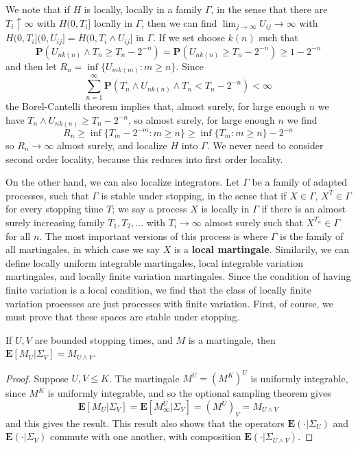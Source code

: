 We note that if $H$ is locally, locally in a family $\Gamma$, in the sense that there are $T_i \uparrow \infty$ with $H(0,T_i]$ locally in $\Gamma$, then we can find $\lim_{j \to \infty} U_{ij} \to \infty$ with $H(0,T_i](0,U_{ij}] = H(0,T_i \wedge U_{ij}]$ in $\Gamma$. If we set choose $k(n)$ such that 
%
\[ \mathbf{P}(U_{nk(n)} \wedge T_n \geq T_n - 2^{-n}) = \mathbf{P}(U_{nk(n)} \geq T_n - 2^{-n}) \geq 1 - 2^{-n} \]
%
and then let $R_n = \inf \{ U_{mk(m)}: m \geq n \}$. Since
%
\[ \sum_{n = 1}^\infty \mathbf{P}(T_n \wedge U_{nk(n)} \wedge T_n < T_n - 2^{-n}) < \infty \]
%
the Borel-Cantelli theorem implies that, almost surely, for large enough $n$ we have $T_n \wedge U_{nk(n)} \geq T_n - 2^{-n}$, so almost surely, for large enough $n$ we find
%
\[ R_n \geq \inf \{ T_m - 2^{-m}: m \geq n \} \geq \inf \{ T_m : m \geq n \} - 2^{-n} \]
%
so $R_n \to \infty$ almost surely, and localize $H$ into $\Gamma$. We never need to consider second order locality, because this reduces into first order locality.

On the other hand, we can also localize integrators. Let $\Gamma$ be a family of adapted processes, such that $\Gamma$ is stable under stopping, in the sense that if $X \in \Gamma$, $X^T \in \Gamma$ for every stopping time $T$; we say a process $X$ is locally in $\Gamma$ if there is an almost surely increasing family $T_1, T_2, \dots$ with $T_i \to \infty$ almost surely such that $X^{T_n} \in \Gamma$ for all $n$. The most important versions of this process is where $\Gamma$ is the family of all martingales, in which case we say $X$ is a {\bf local martingale}. Similarily, we can define locally uniform integrable martingales, local integrable variation martingales, and locally finite variation martingales. Since the condition of having finite variation is a local condition, we find that the class of locally finite variation processes are just processes with finite variation. First, of course, we must prove that these spaces are stable under stopping.

\begin{lemma}
    If $U,V$ are bounded stopping times, and $M$ is a martingale, then $\mathbf{E}[M_U|\Sigma_V] = M_{U \wedge V}$.
\end{lemma}
\begin{proof}
    Suppose $U,V \leq K$. The martingale $M^U = (M^K)^U$ is uniformly integrable, since $M^K$ is uniformly integrable, and so the optional sampling theorem gives
    \[ \mathbf{E}[M_U|\Sigma_V] = \mathbf{E}[M^U_\infty | \Sigma_V] = (M^U)_V = M_{U \wedge V} \]
    and this gives the result. This result also shows that the operators $\mathbf{E}(\cdot | \Sigma_U)$ and $\mathbf{E}(\cdot | \Sigma_V)$ commute with one another, with composition $\mathbf{E}(\cdot | \Sigma_{U \wedge V})$.
\end{proof}


